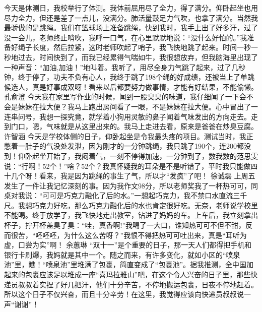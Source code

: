 {}今天是体测日，我校举行了体测。我体前屈用尽了全力，得了满分。仰卧起坐也用尽力全力，但还是差了一点儿，没满分。肺活量鼓足力气吹，也拿了满分。当然我最骄傲的是跳绳。我们在篮球场上准备跳绳，快到我时，我手上出了好多汗，过了没一会儿，老师终止哨吹，我呼一口气，在心里默默地说：“没什么好怕的。”我准备好绳子长度，然后拉紧，这时老师吹起了哨子，我飞快地跳了起来。时间一秒一秒地过去，时间快到了，而我已经累得气喘如牛，我很想放弃，但我脑海里出现了一种声音：“加油,加油！”地叫着。我听了，用尽全身力气跳了起来，过了几秒钟，终于停了，功夫不负有心人，我终于跳了198个绳的好成绩，还被当上了单跳候选人，真是好事成双呀！看来以后都要努力做事情，才能有好结果，不能偷懒。\markdownRendererInterblockSeparator
{}\markdownRendererInterblockSeparator
{}孔俞澄\markdownRendererInterblockSeparator
{}今天我在家里写作业的时候，闻到一股臭臭的味道，我仔细闻了一下会不会是妹妹在拉大便？我马上跑出房间看了一眼，不是妹妹在拉大便。心中冒出了一连串问号，我想一探究竟，就学着小狗用灵敏的鼻子闻着气味发出的方向走去。走到门口，嗯，气味就是从这里出来的。我马上走进去看，原来是爸爸在炒臭豆腐。\markdownRendererInterblockSeparator
{}\markdownRendererInterblockSeparator
{}许智涵\markdownRendererInterblockSeparator
{}今天是学校体侧的日子，仰卧起坐是令我最头疼的项目。测试当时，我正憋着一肚子的气没处发泄，因为刚才的一分钟跳绳，我只跳了190个，连200都没到！仰卧起坐开始了，我闷着气，一刻不停得加速，一分钟到了，数我数的范思雯说：“行啊！52个！”啥？52个？我真怀疑我的耳朵是不是听错了，平时我只能做四十几个呀！看来，我是因为跳绳的事生了气，所以才“发疯”了吧！ \markdownRendererInterblockSeparator
{}\markdownRendererInterblockSeparator
{}徐诚磊\markdownRendererInterblockSeparator
{}上周五发生了一件让我记忆深刻的事。因为我作文98分，所以老师奖我了一杯热可可，同桌对我说：“可可是巧克力融化了后的水。”一想起巧克力，我不禁口水直流三千尺。我想巧克力好吃，那么巧克力融化后的水也肯定很好吃。无奈，老师说学校里不能喝。终于放学了，我飞快地走出教室，钻进了妈妈的车。上车后，我立刻拿出杯子，拧开杯盖臭了臭：“哇，真香啊!”我喝了一大口，谁知热可可不但不甜，反而很苦，“呸呸呸，为什么这么苦呀？”我恨不得把热可可吐出来，真是“耳听为虚，口尝为实”啊！\markdownRendererInterblockSeparator
{}\markdownRendererInterblockSeparator
{}余蕙琳\markdownRendererInterblockSeparator
{}“双十一”是个重要的日子，那一天人们都得把手机和银行卡刷爆，我妈就是其中一个。随之而来，有许多变化，就如小区的“喷泉池”里，瞧！“喷泉池”里堆满了包裹，简直变成了“包裹池”。据我推测，全中国加起来的包裹应该足以堆成一座“喜玛拉雅山”吧，在这个令人兴奋的日子里，那些快递员叔叔着实捏了好几把汗，他们十分辛苦，不停地搬运包裹，日夜不停地赶着。所以这个日子不仅兴奋，而且十分辛劳！在这里，我觉得应该向快递员叔叔说一声“谢谢”！\markdownRendererInterblockSeparator
